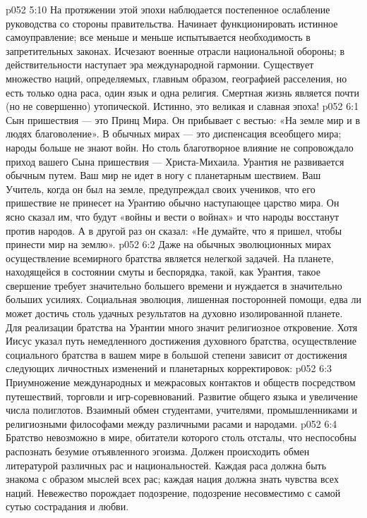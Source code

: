 \vs p052 5:10 На протяжении этой эпохи наблюдается постепенное ослабление руководства со стороны правительства. Начинает функционировать истинное самоуправление; все меньше и меньше испытывается необходимость в запретительных законах. Исчезают военные отрасли национальной обороны; в действительности наступает эра международной гармонии. Существует множество наций, определяемых, главным образом, географией расселения, но есть только одна раса, один язык и одна религия. Смертная жизнь является почти (но не совершенно) утопической. Истинно, это великая и славная эпоха!
\vs p052 6:1 Сын пришествия --- это Принц Мира. Он прибывает с вестью: «На земле мир и в людях благоволение». В обычных мирах --- это диспенсация всеобщего мира; народы больше не знают войн. Но столь благотворное влияние не сопровождало приход вашего Сына пришествия --- Христа\hyp{}Михаила. Урантия не развивается обычным путем. Ваш мир не идет в ногу с планетарным шествием. Ваш Учитель, когда он был на земле, предупреждал своих учеников, что его пришествие не принесет на Урантию обычно наступающее царство мира. Он ясно сказал им, что будут «войны и вести о войнах» и что народы восстанут против народов. А в другой раз он сказал: «Не думайте, что я пришел, чтобы принести мир на землю».
\vs p052 6:2 Даже на обычных эволюционных мирах осуществление всемирного братства является нелегкой задачей. На планете, находящейся в состоянии смуты и беспорядка, такой, как Урантия, такое свершение требует значительно большего времени и нуждается в значительно больших усилиях. Социальная эволюция, лишенная посторонней помощи, едва ли может достичь столь удачных результатов на духовно изолированной планете. Для реализации братства на Урантии много значит религиозное откровение. Хотя Иисус указал путь немедленного достижения духовного братства, осуществление социального братства в вашем мире в большой степени зависит от достижения следующих личностных изменений и планетарных корректировок:
\vs p052 6:3 \bibnobreakspace {} Приумножение международных и межрасовых контактов и обществ посредством путешествий, торговли и игр\hyp{}соревнований. Развитие общего языка и увеличение числа полиглотов. Взаимный обмен студентами, учителями, промышленниками и религиозными философами между различными расами и народами.
\vs p052 6:4 \pc {}\bibnobreakspace {} Братство невозможно в мире, обитатели которого столь отсталы, что неспособны распознать безумие отъявленного эгоизма. Должен происходить обмен литературой различных рас и национальностей. Каждая раса должна быть знакома с образом мыслей всех рас; каждая нация должна знать чувства всех наций. Невежество порождает подозрение, подозрение несовместимо с самой сутью сострадания и любви.
